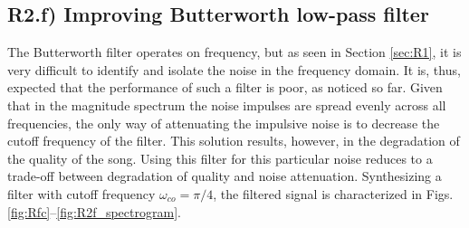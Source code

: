 \documentclass[a4paper, oneside, 11pt]{article}
\begin{document}
\subsection{R2.f) Improving Butterworth low-pass filter}

The Butterworth filter operates on frequency, but as seen in Section \ref{sec:R1}, it is very difficult to identify and isolate the noise in the frequency domain. It is, thus, expected that the performance of such a filter is poor, as noticed so far. Given that in the magnitude spectrum the noise impulses are spread evenly across all frequencies, the only way of attenuating the impulsive noise is to decrease the cutoff frequency of the filter. This solution results, however, in the degradation of the quality of the song. Using this filter for this particular noise reduces to a trade-off between degradation of quality and noise attenuation. Synthesizing a filter with cutoff frequency $\omega_{co} = \pi/4$, the filtered signal is characterized in Figs. \ref{fig:Rfc}--\ref{fig:R2f_spectrogram}. 
\end{document}
